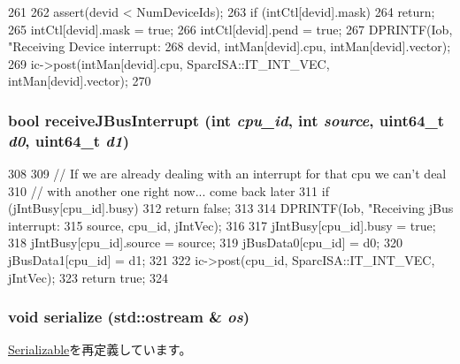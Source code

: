 \begin{DoxyCode}
261 {
262     assert(devid < NumDeviceIds);
263     if (intCtl[devid].mask)
264         return;
265     intCtl[devid].mask = true;
266     intCtl[devid].pend = true;
267     DPRINTF(Iob, "Receiving Device interrupt: %
268             devid, intMan[devid].cpu, intMan[devid].vector);
269     ic->post(intMan[devid].cpu, SparcISA::IT_INT_VEC, intMan[devid].vector);
270 }
\end{DoxyCode}
\hypertarget{classIob_abfe9b96f27c7834ff2c1302d6afea7c0}{
\subsubsection[{receiveJBusInterrupt}]{\setlength{\rightskip}{0pt plus 5cm}bool receiveJBusInterrupt (int {\em cpu\_\-id}, \/  int {\em source}, \/  uint64\_\-t {\em d0}, \/  uint64\_\-t {\em d1})}}
\label{classIob_abfe9b96f27c7834ff2c1302d6afea7c0}



\begin{DoxyCode}
308 {
309     // If we are already dealing with an interrupt for that cpu we can't deal
310     // with another one right now... come back later
311     if (jIntBusy[cpu_id].busy)
312         return false;
313 
314     DPRINTF(Iob, "Receiving jBus interrupt: %
315             source, cpu_id, jIntVec);
316 
317     jIntBusy[cpu_id].busy = true;
318     jIntBusy[cpu_id].source = source;
319     jBusData0[cpu_id] = d0;
320     jBusData1[cpu_id] = d1;
321 
322     ic->post(cpu_id, SparcISA::IT_INT_VEC, jIntVec);
323     return true;
324 }
\end{DoxyCode}
\hypertarget{classIob_a53e036786d17361be4c7320d39c99b84}{
\subsubsection[{serialize}]{\setlength{\rightskip}{0pt plus 5cm}void serialize (std::ostream \& {\em os})}}
\label{classIob_a53e036786d17361be4c7320d39c99b84}


\hyperlink{classSerializable_ad6272f80ae37e8331e3969b3f072a801}{Serializable}を再定義しています。


